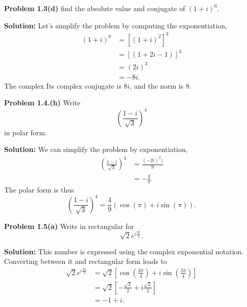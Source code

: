 \documentclass[12pt,oneside]{exam}
\newenvironment{exercise}[1]{\vspace{.1in}\noindent\textbf{Problem #1 \hspace{.05em}}}{}
\begin{document}
\vspace{1cm}

\begin{exercise}{1.3(d)}
find the absolute value and conjugate of $(1+i)^6$. 
\end{exercise}

\noindent \textbf{Solution:} Let's simplify the problem by computing the exponentiation, 
\begin{align*}
(1+i)^6 & = [(1+i)^2]^3 \\
& = [(1+2i-1)]^3 \\
& = (2i)^3\\
& = -8i.
\end{align*}
The complex 
Its complex conjugate is $8i$, and the norm is $8$. 

\vspace{1cm}

\begin{exercise}{1.4.(h)}
Write 
\begin{equation*}
\left( \frac{1-i}{\sqrt{3}} \right)^4
\end{equation*}
in polar form.
\end{exercise}

\noindent \textbf{Solution:} We can simplify the problem by exponentiation, 
\begin{align*}
\left( \frac{1-i}{\sqrt{3}} \right)^4 & = \frac{(-2i)^2)}{9} \\
& = -\frac{4}{9}.
\end{align*}
The polar form is thus 
\begin{equation*}
\left( \frac{1-i}{\sqrt{3}} \right)^4 = \frac{4}{9}(\cos(\pi)+ i \sin(\pi)). 
\end{equation*}

\vspace{1cm}

\begin{exercise}{1.5(a)}
Write in rectangular for
\begin{equation*}
\sqrt{2}e^{i\frac{3\pi}{4}}.
\end{equation*}
\end{exercise}

\noindent \textbf{Solution:} This number is expressed using the complex exponential notation. Converting between it and rectangular form leads to
\begin{align*}
\sqrt{2}e^{i\frac{3\pi}{4}} & = \sqrt{2} \left[ \cos \left(\frac{3\pi}{4}\right) + i\sin \left( \frac{3\pi}{4}\right) \right] \\
& = \sqrt{2} \left[ -\frac{\sqrt{2}}{2} + i \frac{\sqrt{2}}{2} \right] \\
& = -1 + i.
\end{align*}
\end{document}
